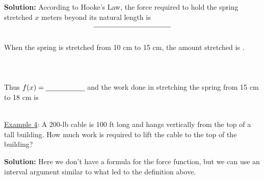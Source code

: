 \documentclass[paper=a4, fontsize=11pt]{scrartcl} %
\numberwithin{equation}{section} %
\numberwithin{figure}{section} %
\numberwithin{table}{section} %
\begin{document}
\textbf{Solution:} According to Hooke's Law, the force required to hold the spring stretched $x$ meters beyond its natural length is \\

\[\underline{\hspace{1.5in}}\]
\indent\\

When the spring is stretched from 10 cm to 15 cm, the amount stretched is \underline{\hspace{1.6in}}.\\
\indent\\
\indent\\
\indent\\

Thus $f(x) = \underline{\hspace{0.75in}}$ and the work done in stretching the spring from 15 cm to 18 cm is\\
\indent\\

\vspace{1.5in}

\underline{Example 4}: A 200-lb cable is 100 ft long and hangs vertically from the top of a tall building. How much work is required to lift the cable to the top of the building?\\
\indent

\textbf{Solution:} Here we don't have a formula for the force function, but we can use an interval argument similar to what led to the definition above.\\
\indent\\

\vspace{3.5in}


\end{document}
